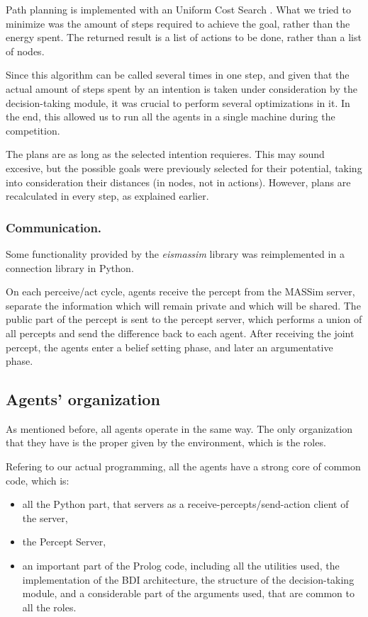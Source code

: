 \documentclass{llncs2e/llncs}
\begin{document}
    Path planning is implemented with an Uniform Cost Search 
    \cite{Russell:2003:AIM:773294}. 
    What we tried to minimize was the amount of steps required to achieve the 
    goal, rather than the energy spent. 
    The returned result is a list of actions to be done, rather than a list of 
    nodes.
    
    Since this algorithm can be called several times in one step, and given that the 
    actual amount of steps spent by an intention is taken under consideration by 
    the decision-taking module, it was crucial to perform several optimizations in 
    it. In the end, this allowed us to run all the agents in a single machine  
    during the competition.
    
    The plans are as long as the selected intention requieres. This may 
    sound excesive, but the possible goals were previously selected for their 
    potential, taking into consideration their distances (in nodes, not in 
    actions). However, plans are recalculated in every step, as explained earlier.    

\subsubsection{Communication.}

    Some functionality provided by the \textit{eismassim} library was
    reimplemented in a connection library in Python.

    On each perceive/act cycle, agents receive the percept from the MASSim server, 
    separate the information which will remain private and which will be shared. 
    The public part of the percept is sent to the percept server, which performs a 
    union of all percepts and send the difference back to each agent. After 
    receiving the joint percept, the agents enter a belief setting phase, and 
    later an argumentative phase.
    

\subsection{Agents' organization}

    As mentioned before, all agents operate in the same way.
    The only organization that they have is the proper given by the environment, 
    which is the roles.
    
    Refering to our actual programming, all the agents have a strong core of common
    code, which is:
    
    \begin{itemize}
    \item all the Python part, that servers as a receive-percepts/send-action client 
    of the server,
    
    \item the Percept Server,
    
    \item an important part of the Prolog code, including all the utilities used, the
    implementation of the BDI architecture, the structure of the 
    decision-taking module, and a considerable part of the arguments used, that
    are common to all the roles.
    \end{itemize}
    
\end{document}

